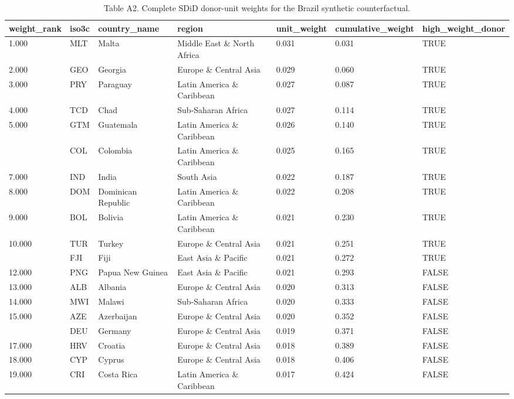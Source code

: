 \begin{table}

\caption{\label{tab:tab:sdid-unit-weights}Table A2. Complete SDiD donor-unit weights for the Brazil synthetic counterfactual.}
\centering
\begin{tabular}[t]{lllllll}
\toprule
weight\_rank & iso3c & country\_name & region & unit\_weight & cumulative\_weight & high\_weight\_donor\\
\midrule
1.000 & MLT & Malta & Middle East \& North Africa & 0.031 & 0.031 & TRUE\\
2.000 & GEO & Georgia & Europe \& Central Asia & 0.029 & 0.060 & TRUE\\
3.000 & PRY & Paraguay & Latin America \& Caribbean & 0.027 & 0.087 & TRUE\\
4.000 & TCD & Chad & Sub-Saharan Africa & 0.027 & 0.114 & TRUE\\
5.000 & GTM & Guatemala & Latin America \& Caribbean & 0.026 & 0.140 & TRUE\\
\addlinespace
6.000 & COL & Colombia & Latin America \& Caribbean & 0.025 & 0.165 & TRUE\\
7.000 & IND & India & South Asia & 0.022 & 0.187 & TRUE\\
8.000 & DOM & Dominican Republic & Latin America \& Caribbean & 0.022 & 0.208 & TRUE\\
9.000 & BOL & Bolivia & Latin America \& Caribbean & 0.021 & 0.230 & TRUE\\
10.000 & TUR & Turkey & Europe \& Central Asia & 0.021 & 0.251 & TRUE\\
\addlinespace
11.000 & FJI & Fiji & East Asia \& Pacific & 0.021 & 0.272 & TRUE\\
12.000 & PNG & Papua New Guinea & East Asia \& Pacific & 0.021 & 0.293 & FALSE\\
13.000 & ALB & Albania & Europe \& Central Asia & 0.020 & 0.313 & FALSE\\
14.000 & MWI & Malawi & Sub-Saharan Africa & 0.020 & 0.333 & FALSE\\
15.000 & AZE & Azerbaijan & Europe \& Central Asia & 0.020 & 0.352 & FALSE\\
\addlinespace
16.000 & DEU & Germany & Europe \& Central Asia & 0.019 & 0.371 & FALSE\\
17.000 & HRV & Croatia & Europe \& Central Asia & 0.018 & 0.389 & FALSE\\
18.000 & CYP & Cyprus & Europe \& Central Asia & 0.018 & 0.406 & FALSE\\
19.000 & CRI & Costa Rica & Latin America \& Caribbean & 0.017 & 0.424 & FALSE\\

\end{tabular}
\end{table}
